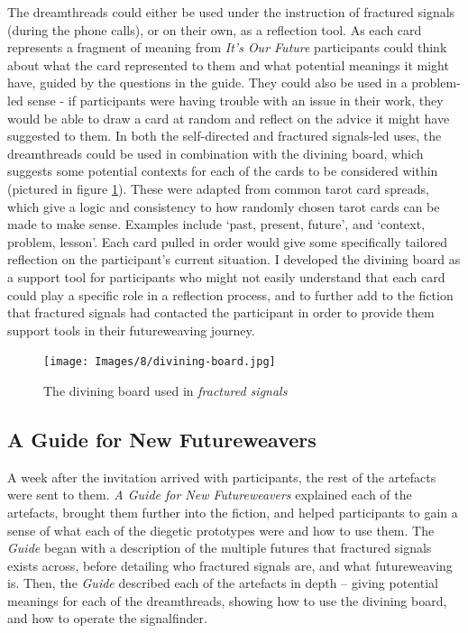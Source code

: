 The dreamthreads could either be used under the instruction of fractured signals (during the phone calls), or on their own, as a reflection tool. As each card represents a fragment of meaning from \textit{It’s Our Future} participants could think about what the card represented to them and what potential meanings it might have, guided by the questions in the guide. They could also be used in a problem-led sense - if participants were having trouble with an issue in their work, they would be able to draw a card at random and reflect on the advice it might have suggested to them. In both the self-directed and fractured signals-led uses, the dreamthreads could be used in combination with the divining board, which suggests some potential contexts for each of the cards to be considered within (pictured in figure \ref{fig:divining-board}). These were adapted from common tarot card spreads, which give a logic and consistency to how randomly chosen tarot cards can be made to make sense. Examples include ‘past, present, future’, and ‘context, problem, lesson’. Each card pulled in order would give some specifically tailored reflection on the participant's current situation. I developed the divining board as a support tool for participants who might not easily understand that each card could play a specific role in a reflection process, and to further add to the fiction that fractured signals had contacted the participant in order to provide them support tools in their futureweaving journey.
\begin{figure}
    \centering
    \texttt{[image: Images/8/divining-board.jpg]}
    \caption{The divining board used in \textit{fractured signals}}
    \label{fig:divining-board}
\end{figure}

\subsection{A Guide for New Futureweavers}

A week after the invitation arrived with participants, the rest of the artefacts were sent to them. \textit{A Guide for New Futureweavers} explained each of the artefacts, brought them further into the fiction, and helped participants to gain a sense of what each of the diegetic prototypes were and how to use them. The \textit{Guide} began with a description of the multiple futures that fractured signals exists across, before detailing who fractured signals are, and what futureweaving is. Then, the \textit{Guide} described each of the artefacts in depth – giving potential meanings for each of the dreamthreads, showing how to use the divining board, and how to operate the signalfinder. 

